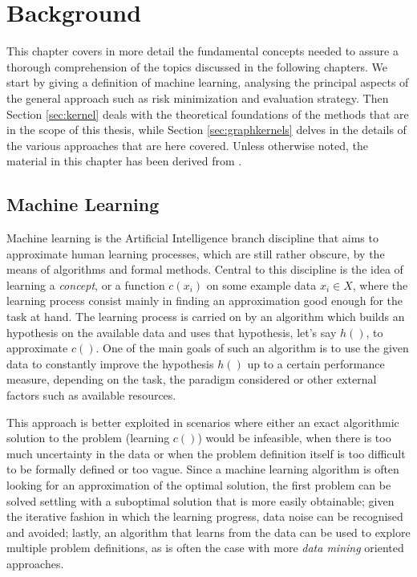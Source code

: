 
\chapter{Background} %
This chapter covers in more detail the fundamental concepts needed to assure a
thorough comprehension of the topics discussed in the following chapters.
We start by giving a definition of machine learning, analysing the 
principal aspects of the general approach such as risk minimization and evaluation
strategy.
Then Section \ref{sec:kernel} deals with the theoretical foundations of the 
methods that are in the scope of this thesis, while Section \ref{sec:graphkernels}
delves in the details of the various approaches that are here covered.
Unless otherwise noted, the material in this chapter has been derived
from \cite{nnavarin, rtesselli}.

\label{Chapter2} %

\section{Machine Learning}

Machine learning is the Artificial Intelligence branch discipline that aims
to approximate human learning processes, which are still rather obscure,
by the means of algorithms and formal methods.
Central to this discipline is the idea of learning a \emph{concept}, or a function
$c(x_i)$ on some example data $x_i \in X$, where the learning process consist
mainly in finding an approximation good enough for the task at hand.
The learning process is carried on by an algorithm which builds an hypothesis
on the available data and uses that hypothesis, let's say $h()$,  to approximate
$c()$.
One of the main goals of such an algorithm is to use the given data to constantly
improve the hypothesis $h()$ up to a certain performance measure, depending
on the task, the paradigm considered or other external factors such as available
resources.

This approach is better exploited in scenarios where either an exact
algorithmic solution to the problem (learning $c()$) would be infeasible, when
there is too much uncertainty in the data or when the problem definition itself
is too difficult to be formally defined or too vague.
Since a machine learning algorithm is often looking for an approximation of the 
optimal solution, the first problem can be solved settling with a suboptimal
solution that is more easily obtainable; given the iterative fashion in which
the learning progress, data noise can be recognised and avoided; lastly,
an algorithm that learns from the data can be used to explore multiple problem
definitions, as is often the case with more \emph{data mining} oriented approaches.

